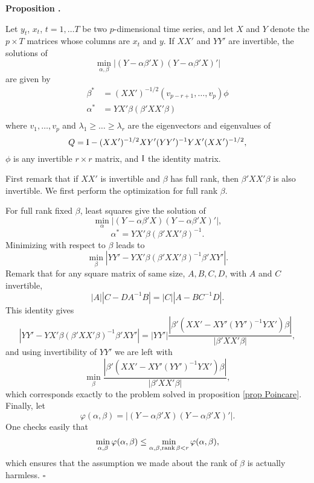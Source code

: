 \documentclass[12pt, leqno]{article}
\newcommand{\id}{\text{\rm I}}
\newcommand{\rk}{\text{\rm rank}\,}
\renewcommand{\det}[1]{|#1|}
\newcounter{prop}
\renewcommand{\theprop}{\arabic{prop}}
\newenvironment{prop}[0]%
{\refstepcounter{prop}\vspace{10pt}\par\noindent 
{\bf Proposition \theprop.}
\begin{itshape}}%
{\end{itshape}\par\vspace{0.2cm}}
\newcounter{ex}
\newcounter{rem}
\newcounter{prob}
\newenvironment{proof}{\noindent {\em Proof. }}%
{$\square$ \par \vspace{10pt} \noindent}
\begin{document}
\begin{prop}
Let $y_t$, $x_t$, $t=1,\ldots T$ be two $p$-dimensional time series, and
let $X$ and $Y$ denote the $p\times T$ matrices whose columns are 
$x_t$ and $y$. If $X X'$ and $Y Y'$ are invertible, the solutions of 
$$
\min_{\alpha, \beta} \det{(Y - \alpha \beta' X) (Y - \alpha \beta' X)'}
$$
are given by 
\begin{align*}
\beta^* & = (X X')^{-1/2} \left( v_{p-r+1},\ldots,v_p \right) \phi \\[0.2cm]
\alpha^* & = Y X' \beta \left( \beta' X X' \beta \right) \\
\end{align*}
where $v_1,\ldots, v_p$ and $\lambda_1 \geq \ldots \geq \lambda_r$ are
the eigenvectors and eigenvalues of
$$
Q = \id - (X X')^{-1/2} X Y' (Y Y')^{-1} Y X' (X X')^{-1/2},
$$
$\phi$ is any invertible $r\times r$ matrix, and $\id$ the identity matrix.
\end{prop}
\begin{proof}
First remark that if $X X'$ is invertible and $\beta$ has full rank, then
$\beta' X X' \beta$ is also invertible. We first perform the optimization 
for full rank $\beta$.

For full rank fixed $\beta$, least squares give the solution of
$$
\min_\alpha \det{(Y - \alpha \beta' X) (Y - \alpha \beta' X)'},
$$
$$
\alpha^* = Y X' \beta (\beta' X X' \beta)^{-1}.
$$
Minimizing with respect to $\beta$ leads to 
$$
\min_{\beta} \det{Y Y' - Y X' \beta (\beta' X X' \beta)^{-1} \beta' X Y'}.
$$
Remark that for any square matrix of same size, $A,B,C,D$, with $A$ and $C$ invertible,
$$
\det {A} \det{C - D A^{-1} B} = \det {C} \det{A - B C^{-1} D}.
$$
This identity gives
$$
\det{Y Y' - Y X' \beta (\beta' X X' \beta)^{-1} \beta' X Y'} = 
\det{Y Y'} \frac{\det{\beta' (X X' - X Y' (Y Y')^{-1} Y X') \beta}}{\det{\beta' X X' \beta}},
$$
and using invertibility of $Y Y'$ we are left with 
$$
\min_{\beta} \frac{\det{\beta' (X X' - X Y' (Y Y')^{-1} Y X') \beta}}{\det{\beta' X X' \beta}},
$$
which corresponds exactly to the problem solved in proposition \ref{prop Poincare}.
Finally, let 
$$
\varphi(\alpha, \beta) = \det{(Y - \alpha \beta' X) (Y - \alpha \beta' X)'}.
$$
One checks easily that 
$$
\min_{\alpha, \beta} \varphi(\alpha, \beta) \leq \min_{\alpha, \beta, \rk \beta <r } \varphi(\alpha, \beta),
$$
which ensures that the assumption we made about the rank of 
$\beta$ is actually harmless.
\end{proof}
\end{document}

